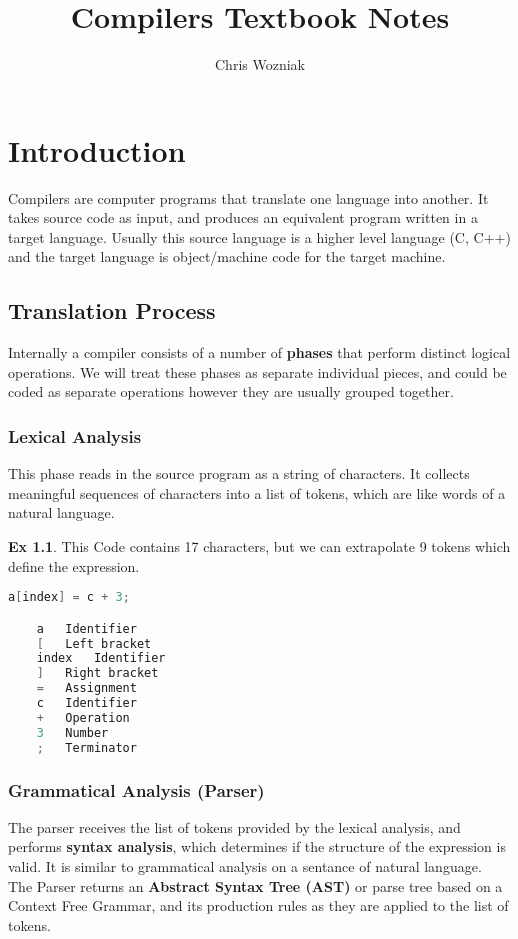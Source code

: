 \documentclass{report}
\title{Compilers Textbook Notes}
\author{Chris Wozniak}
\theoremstyle{definition}
\newtheorem*{examp}{Ex}
\begin{document}
\maketitle
\tableofcontents
\chapter{Introduction}
	Compilers are computer programs that translate one language into another. It takes source code as input, and produces
	an equivalent program written in a target language. Usually this source language is a higher level language (C, C++) and the 
	target language is object/machine code for the target machine.

	\section{Translation Process}
		Internally a compiler consists of a number of \textbf{phases} that perform distinct logical operations. We will treat these
		phases as separate individual pieces, and could be coded as separate operations however they are usually grouped together.

		\subsection{Lexical Analysis}
			This phase reads in the source program as a string of characters. It collects meaningful sequences of characters into 
			a list of tokens, which are like words of a natural language.
			\begin{examp}
				This Code contains 17 characters, but we can extrapolate 9 tokens which define the expression.
				\begin{lstlisting}[language=c]
	a[index] = c + 3;

	a 	Identifier
	[	Left bracket
	index 	Identifier
	]	Right bracket
	= 	Assignment
	c 	Identifier
	+ 	Operation
	3	Number
	;	Terminator
				\end{lstlisting}
			\end{examp}
\newpage
		\subsection{Grammatical Analysis (Parser)}
			The parser receives the list of tokens provided by the lexical analysis, and performs \textbf{syntax analysis}, which
			determines if the structure of the expression is valid. It is similar to grammatical analysis on a sentance of natural language.\\
			The Parser returns an \textbf{Abstract Syntax Tree (AST)} or parse tree based on a Context Free Grammar, and its
			production rules as they are applied to the list of tokens. 
\end{document}
